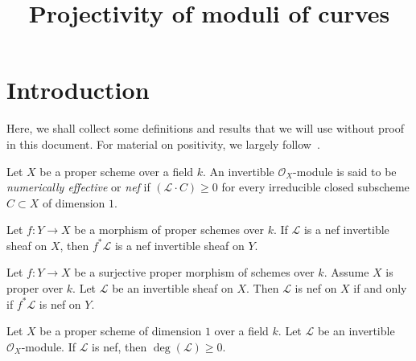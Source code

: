 

\usepackage[inline]{showlabels}
\linespread{1.1}

\title{Projectivity of moduli of curves}
\maketitle
\tableofcontents

\section{Introduction}
\label{section-introduction}
Here, we shall collect some definitions and results that we will use without
proof in this document.
For material on positivity, we largely follow~\cite{lazI,lazII}.

\begin{definition}
\label{definition-nef-invertible-sheaf}
Let $X$ be a proper scheme over a field $k$.
An invertible $\mathcal{O}_X$-module is said to be \emph{numerically effective}
or \emph{nef} if $(\mathcal{L} \cdot C) \geq 0$ for every irreducible closed
subscheme $C \subset X$ of dimension $1$.
\end{definition}

\begin{lemma}
\label{lemma-nef-pullback-nef}
\begin{reference}
\cite[Example 1.4.4(i)]{lazI}
\end{reference}
Let $f : Y \to X$ be a morphism of proper schemes over $k$.
If $\mathcal{L}$ is a nef invertible sheaf on $X$,
then $f^*\mathcal{L}$ is a nef invertible sheaf on $Y$.
\end{lemma}

\begin{lemma}
\label{lemma-nef-proper-surjective-nef}
\begin{reference}
\cite[Example 1.4.4(ii)]{lazI}
\end{reference}
Let $f : Y \to X$ be a surjective proper morphism of schemes over $k$.
Assume $X$ is proper over $k$.
Let $\mathcal{L}$ be an invertible sheaf on $X$.
Then $\mathcal{L}$ is nef on $X$ if and only if $f^*\mathcal{L}$ is nef on $Y$.
\end{lemma}

\begin{lemma}
\label{lemma-degree-of-nef-on-curve}
Let $X$ be a proper scheme of dimension $1$ over a field $k$.
Let $\mathcal{L}$ be an invertible $\mathcal{O}_X$-module.
If $\mathcal{L}$ is nef, then $\deg(\mathcal{L}) \geq 0$.
\end{lemma}


